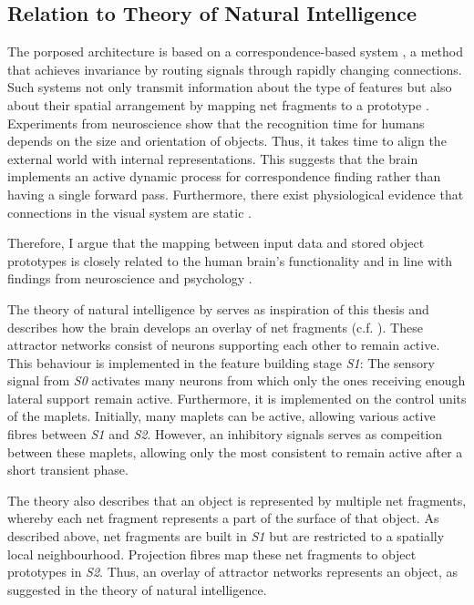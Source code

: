 \subsection{Relation to Theory of Natural Intelligence}
The porposed architecture is based on a correspondence-based system , a method that achieves invariance by routing signals through rapidly changing connections. Such systems not only transmit information about the type of features but also about their spatial arrangement by mapping net fragments to a prototype .
Experiments from neuroscience show that the recognition time for humans depends on the size  and orientation  of objects. Thus, it takes time to align the external world with internal representations.
This suggests that the brain implements an active dynamic process for correspondence finding rather than having a single forward pass.
Furthermore, there exist physiological evidence that connections in the visual system are static .

Therefore, I argue that the mapping between input data and stored object prototypes is closely related to the human brain's functionality and in line with findings from neuroscience \cite{kandel_principles_2013, olshausen_emergence_1996, vogels_inhibitory_2011, payeur_burst-dependent_2021} and psychology \cite{ellis_source_1938, kohler_gestalt_1992, wagemans_century_2012, hamlyn_psychology_2017}.

The theory of natural intelligence by  serves as inspiration of this thesis and describes how the brain develops an overlay of net fragments (c.f. ). These attractor networks consist of neurons supporting each other to remain active.
This behaviour is implemented in the feature building stage \emph{S1}: The sensory signal from \emph{S0} activates many neurons from which only the ones receiving enough lateral support remain active. Furthermore, it is implemented on the control units of the maplets. Initially, many maplets can be active, allowing various active fibres between \emph{S1} and \emph{S2}. However, an inhibitory signals serves as compeition between these maplets, allowing only the most consistent to remain active after a short transient phase.

The theory also describes that an object is represented by multiple net fragments, whereby each net fragment represents a part of the surface of that object.
As described above, net fragments are built in \emph{S1} but are restricted to a spatially local neighbourhood. Projection fibres map these net fragments to object prototypes in \emph{S2}. Thus, an overlay of attractor networks represents an object, as suggested in the theory of natural intelligence.

